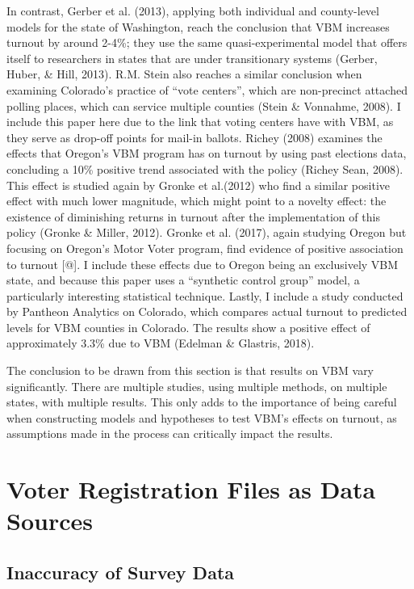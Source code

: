 \documentclass[12pt,twoside]{reedthesis}
\begin{document}
  In contrast, Gerber et al. (2013), applying both individual and
  county-level models for the state of Washington, reach the conclusion
  that VBM increases turnout by around 2-4\%; they use the same
  quasi-experimental model that offers itself to researchers in states
  that are under transitionary systems (Gerber, Huber, \& Hill, 2013).
  R.M. Stein also reaches a similar conclusion when examining Colorado's
  practice of ``vote centers'', which are non-precinct attached polling
  places, which can service multiple counties (Stein \& Vonnahme, 2008). I
  include this paper here due to the link that voting centers have with
  VBM, as they serve as drop-off points for mail-in ballots. Richey (2008)
  examines the effects that Oregon's VBM program has on turnout by using
  past elections data, concluding a 10\% positive trend associated with
  the policy (Richey Sean, 2008). This effect is studied again by Gronke
  et al.(2012) who find a similar positive effect with much lower
  magnitude, which might point to a novelty effect: the existence of
  diminishing returns in turnout after the implementation of this policy
  (Gronke \& Miller, 2012). Gronke et al. (2017), again studying Oregon
  but focusing on Oregon's Motor Voter program, find evidence of positive
  association to turnout {[}@{]}. I include these effects due to Oregon
  being an exclusively VBM state, and because this paper uses a
  ``synthetic control group'' model, a particularly interesting
  statistical technique. Lastly, I include a study conducted by Pantheon
  Analytics on Colorado, which compares actual turnout to predicted levels
  for VBM counties in Colorado. The results show a positive effect of
  approximately 3.3\% due to VBM (Edelman \& Glastris, 2018).
  
  The conclusion to be drawn from this section is that results on VBM vary
  significantly. There are multiple studies, using multiple methods, on
  multiple states, with multiple results. This only adds to the importance
  of being careful when constructing models and hypotheses to test VBM's
  effects on turnout, as assumptions made in the process can critically
  impact the results.
  
  \section{Voter Registration Files as Data
  Sources}\label{voter-registration-files-as-data-sources}
  
  \subsection{Inaccuracy of Survey Data}\label{inaccuracy-of-survey-data}
  
\end{document}
